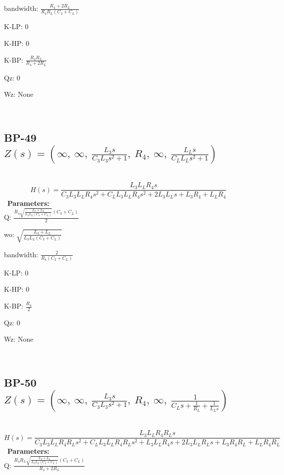 \documentclass{article}
\begin{document}
bandwidth: $\frac{R_{4} + 2 R_{L}}{R_{4} R_{L} \left(C_{3} + C_{L}\right)}$\ 

K-LP: $0$\ 

K-HP: $0$\ 

K-BP: $\frac{R_{4} R_{L}}{R_{4} + 2 R_{L}}$\ 

Qz: $0$\ 

Wz: $\text{None}$\ 

\ 

\subsection{BP-49 $Z(s) = \left( \infty, \  \infty, \  \frac{L_{3} s}{C_{3} L_{3} s^{2} + 1}, \  R_{4}, \  \infty, \  \frac{L_{L} s}{C_{L} L_{L} s^{2} + 1}\right)$ } \ 
\textbf{\[H(s) = \frac{L_{3} L_{L} R_{4} s}{C_{3} L_{3} L_{L} R_{4} s^{2} + C_{L} L_{3} L_{L} R_{4} s^{2} + 2 L_{3} L_{L} s + L_{3} R_{4} + L_{L} R_{4}}\] } \ 
\textbf{Parameters:}\\ 

Q: $\frac{R_{4} \sqrt{\frac{L_{3} + L_{L}}{L_{3} L_{L} \left(C_{3} + C_{L}\right)}} \left(C_{3} + C_{L}\right)}{2}$\ 

wo: $\sqrt{\frac{L_{3} + L_{L}}{L_{3} L_{L} \left(C_{3} + C_{L}\right)}}$\ 

bandwidth: $\frac{2}{R_{4} \left(C_{3} + C_{L}\right)}$\ 

K-LP: $0$\ 

K-HP: $0$\ 

K-BP: $\frac{R_{4}}{2}$\ 

Qz: $0$\ 

Wz: $\text{None}$\ 

\ 

\subsection{BP-50 $Z(s) = \left( \infty, \  \infty, \  \frac{L_{3} s}{C_{3} L_{3} s^{2} + 1}, \  R_{4}, \  \infty, \  \frac{1}{C_{L} s + \frac{1}{R_{L}} + \frac{1}{L_{L} s}}\right)$ } \ 
\textbf{\[H(s) = \frac{L_{3} L_{L} R_{4} R_{L} s}{C_{3} L_{3} L_{L} R_{4} R_{L} s^{2} + C_{L} L_{3} L_{L} R_{4} R_{L} s^{2} + L_{3} L_{L} R_{4} s + 2 L_{3} L_{L} R_{L} s + L_{3} R_{4} R_{L} + L_{L} R_{4} R_{L}}\] } \ 
\textbf{Parameters:}\\ 

Q: $\frac{R_{4} R_{L} \sqrt{\frac{L_{3} + L_{L}}{L_{3} L_{L} \left(C_{3} + C_{L}\right)}} \left(C_{3} + C_{L}\right)}{R_{4} + 2 R_{L}}$\ 
\end{document}

